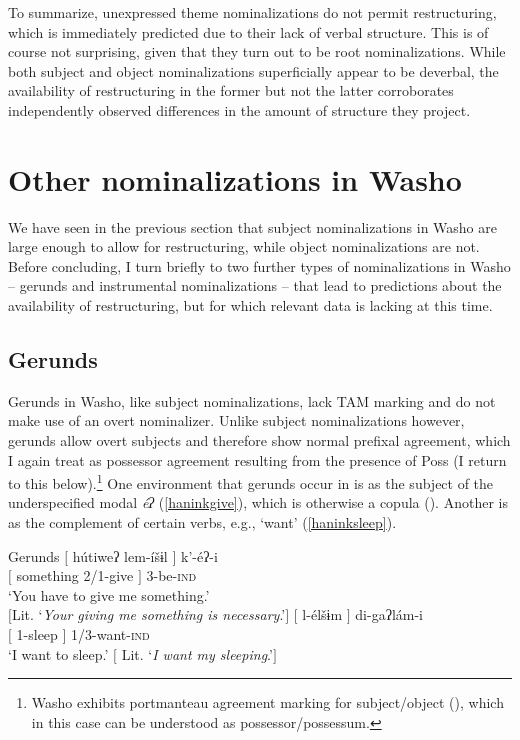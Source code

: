 \documentclass[output=paper]{langscibook}
\begin{document}
To summarize, unexpressed theme nominalizations do not permit restructuring, which is immediately predicted due to their lack of verbal structure. This is of course not surprising, given that they turn out to be root nominalizations. While both subject and object nominalizations superficially appear to be deverbal, the availability of restructuring in the former but not the latter corroborates independently observed differences in the amount of structure they project.

\section{Other nominalizations in Washo} \label{haninksec:4}

We have seen in the previous section that subject nominalizations in Washo are large enough to allow for restructuring, while object nominalizations are not. Before concluding, I turn briefly to two further types of nominalizations in Washo -- gerunds and instrumental nominalizations -- that lead to predictions about the availability of restructuring, but for which relevant data is lacking at this time.

\subsection{Gerunds}

Gerunds in Washo, like subject nominalizations,  lack TAM marking and do not make use of an overt nominalizer. Unlike subject nominalizations however, gerunds allow overt subjects and therefore show normal prefixal agreement, which I again treat as possessor agreement resulting from the presence of Poss (I return to this below).\footnote{Washo exhibits portmanteau agreement marking for subject/object (\citealt{jacobsen1964}), which in this case can be understood as possessor/possessum.} One  environment that gerunds occur in is as the subject of the underspecified modal {\itshape éʔ} (\ref{haninkgive}), which is otherwise a copula (\citealt{bochnak2015wscla,bochnak2015nels}). Another is as the  complement of certain  verbs, e.g., `want' (\ref{haninksleep}).
 
 \ea Gerunds \label{haninkgerunds}
 \ea \gll $[$ hútiweʔ lem-íšɨl $]$ k'-éʔ-i\\
$[$ something  2/1-give $]$ 3-be-{\scshape ind}\\
\glt `You have to give me something.' \\ $[$Lit. `{\itshape Your giving me something is necessary}.'$]$ \label{haninkgive}
 \ex \gll $[$ l-élšɨm $]$ di-gaʔlám-i\\
$[$ 1-sleep $]$ 1/3-want-{\scshape ind}\\
\glt `I want to sleep.' $[$ Lit. `{\itshape I want my sleeping}.'$]$\label{haninksleep}
 \z
 \z 
 
\end{document}

